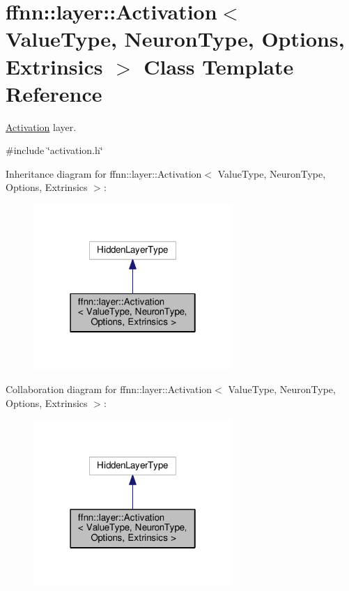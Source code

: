 \hypertarget{classffnn_1_1layer_1_1_activation}{\section{ffnn\-:\-:layer\-:\-:Activation$<$ Value\-Type, Neuron\-Type, Options, Extrinsics $>$ Class Template Reference}
\label{classffnn_1_1layer_1_1_activation}
}


\hyperlink{classffnn_1_1layer_1_1_activation}{Activation} layer.  




{\ttfamily \#include \char`\"{}activation.\-h\char`\"{}}



Inheritance diagram for ffnn\-:\-:layer\-:\-:Activation$<$ Value\-Type, Neuron\-Type, Options, Extrinsics $>$\-:
\nopagebreak
\begin{figure}[H]
\begin{center}
\leavevmode
\includegraphics[width=214pt]{classffnn_1_1layer_1_1_activation__inherit__graph}
\end{center}
\end{figure}


Collaboration diagram for ffnn\-:\-:layer\-:\-:Activation$<$ Value\-Type, Neuron\-Type, Options, Extrinsics $>$\-:
\nopagebreak
\begin{figure}[H]
\begin{center}
\leavevmode
\includegraphics[width=214pt]{classffnn_1_1layer_1_1_activation__coll__graph}
\end{center}
\end{figure}
